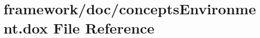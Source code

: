 \hypertarget{concepts_environment_8dox}{}\section{framework/doc/concepts\+Environment.dox File Reference}
\label{concepts_environment_8dox}
